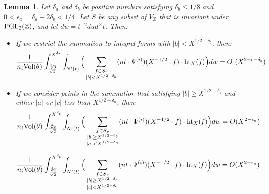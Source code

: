 \documentclass{article}
\def\PGL{{\rm PGL}}
\def\Vol{{\rm Vol}}
\def \h{{\rm ht}}
\newtheorem{lemma}[theorem]{Lemma}
\def \dw{{t^{-2}dud^\times t  }}
\begin{document}
\begin{lemma}\label{abig}
Let $\delta_a$ and $\delta_b$ be positive numbers satisfying $\delta_b \leq 1/8$ and $0<\epsilon_a = \delta_a - 2\delta_b < 1/4$. Let $S$ be any subset of $V_{\mathbb{Z}}$ that is invariant under $\PGL_2(\mathbb{Z})$, and let $dw = \dw$. Then:

\begin{itemize}
    \item[\textnormal{(a)}] If we restrict the summation to  integral forms with $|b|<X^{1/2-\delta_b}$, then:
        \begin{equation*}
      \frac{1}{n_i \Vol(\theta)} \int_{\frac{\sqrt[4]{3}}{\sqrt{2}}}^{X^{\delta_t}} \int_{N'(t)}  
       \Big( \sum_{\substack{f \in S_{r} \\ |b|<X^{1/2-\delta_b}}} (nt \cdot \Psi^{(i)})(X^{-1/2} \cdot f) \cdot \h_{X}(f) \Big)
      dw= O_{\epsilon}(X^{2+\epsilon-\delta_b})
     \end{equation*}   

     \item[\textnormal{(b)}]  If we consider points in the summation that  satisfying $|b| \geqslant X^{1/2-\delta_b}$ and either $|a|$ or $|c|$ less than $X^{1/2-\delta_a}$, then:
    \begin{equation*}
   \frac{1}{n_i \Vol(\theta)} \int_{\frac{\sqrt[4]{3}}{\sqrt{2}}}^{X^{\delta_t}} \int_{N'(t)}  
       \Big( \sum_{\substack{f \in S_r \\ |b| \geq X^{1/2-\delta_b}\\ |a| <X^{1/2-\delta_a}}} (nt \cdot \Psi^{(i)})(X^{-1/2} \cdot f) \cdot \h_{X}(f) \Big)
      dw= O(X^{2 -\epsilon_a})
 \end{equation*} 
    
    \begin{equation*}
   \frac{1}{n_i \Vol(\theta)} \int_{\frac{\sqrt[4]{3}}{\sqrt{2}}}^{X^{\delta_t}} \int_{N'(t)}  
       \Big( \sum_{\substack{f \in S_r \\ |b| \geq X^{1/2-\delta_b}\\ |c| <X^{1/2-\delta_a}}} (nt \cdot \Psi^{(i)})(X^{-1/2} \cdot f) \cdot \h_{X}(f) \Big)
      dw= O(X^{2 -\epsilon_a})
    \end{equation*} 
\end{itemize}
\end{lemma}
\end{document}
